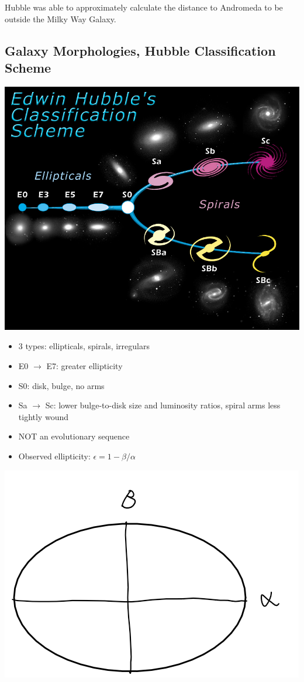 \documentclass{book}
\begin{document}
Hubble was able to approximately calculate the distance to Andromeda to be outside the Milky Way Galaxy.
\subsection{Galaxy Morphologies, Hubble Classification Scheme}
\begin{center}
    \includegraphics[height = 0.4 \textwidth]{images/hubble_class.png}
\end{center}
\begin{itemize}
    \item 3 types: ellipticals, spirals, irregulars
    \item E0 $\to$ E7: greater ellipticity
    \item S0: disk, bulge, no arms
    \item Sa $\to$ Sc: lower bulge-to-disk size and luminosity ratios, spiral arms less tightly wound
    \item NOT an evolutionary sequence
    \item Observed ellipticity: $\epsilon = 1 - \beta / \alpha$
\end{itemize}
\begin{center}
    \includegraphics[height = 0.4 \textwidth]{images/ellipse.png}
\end{center}
\end{document}
